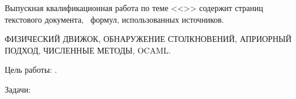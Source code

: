 
Выпускная квалификационная работа по теме <<\Topic>> содержит
\pageref{LastPage} страниц текстового документа,
\totalequations~формул,
 использованных источников.

\MakeUppercase{
    физический движок,
    обнаружение столкновений,
    априорный подход,
    численные методы,
    OCaml.
}

Цель работы: \Target.

Задачи:

\Tasks
